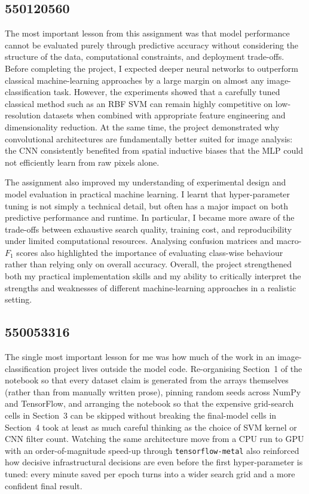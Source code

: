\documentclass[../main.tex]{subfiles}
\begin{document}
\subsection*{550120560}
\noindent
\noindent
The most important lesson from this assignment was that model performance
cannot be evaluated purely through predictive accuracy without considering
the structure of the data, computational constraints, and deployment
trade-offs. Before completing the project, I expected deeper neural
networks to outperform classical machine-learning approaches by a large
margin on almost any image-classification task. However, the experiments
showed that a carefully tuned classical method such as an \gls{RBF}
\gls{SVM} can remain highly competitive on low-resolution datasets when
combined with appropriate feature engineering and dimensionality
reduction. At the same time, the project demonstrated why convolutional
architectures are fundamentally better suited for image analysis: the
\gls{CNN} consistently benefited from spatial inductive biases that the
\gls{MLP} could not efficiently learn from raw pixels alone.

\noindent
The assignment also improved my understanding of experimental design and
model evaluation in practical machine learning. I learnt that
hyper-parameter tuning is not simply a technical detail, but often has a
major impact on both predictive performance and runtime. In particular, I
became more aware of the trade-offs between exhaustive search quality,
training cost, and reproducibility under limited computational resources.
Analysing confusion matrices and macro-$F_{1}$ scores also highlighted
the importance of evaluating class-wise behaviour rather than relying
only on overall accuracy. Overall, the project strengthened both my
practical implementation skills and my ability to critically interpret
the strengths and weaknesses of different machine-learning approaches in
a realistic setting.

\subsection*{550053316}
\noindent
The single most important lesson for me was how much of the work in an
image-classification project lives outside the model code. Re-organising
Section~1 of the notebook so that every dataset claim is generated from the
arrays themselves (rather than from manually written prose), pinning random
seeds across NumPy and TensorFlow, and arranging the notebook so that the
expensive grid-search cells in Section~3 can be skipped without breaking the
final-model cells in Section~4 took at least as much careful thinking as the
choice of SVM kernel or CNN filter count. Watching the same architecture
move from a CPU run to GPU with an order-of-magnitude speed-up
through \texttt{tensorflow-metal} also reinforced how decisive
infrastructural decisions are even before the first hyper-parameter is
tuned: every minute saved per epoch turns into a wider search grid and a
more confident final result.
\end{document}
